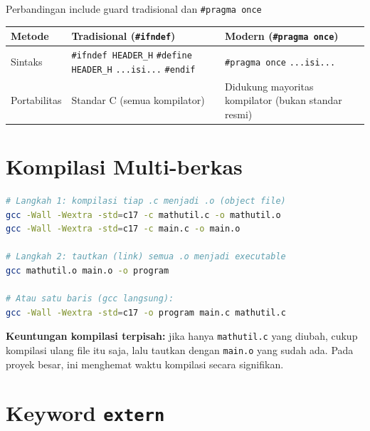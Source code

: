 \documentclass[../main.tex]{subfiles}
\begin{document}
\begin{modultable}[]{Perbandingan include guard tradisional dan \texttt{\#pragma once}}
\begin{tabular}{|l|p{5cm}|p{5cm}|}
\hline
\textbf{Metode} & \textbf{Tradisional (\texttt{\#ifndef})} & \textbf{Modern (\texttt{\#pragma once})} \\
\hline
Sintaks &
\texttt{\#ifndef HEADER\_H} \newline
\texttt{\#define HEADER\_H} \newline
\texttt{...isi...} \newline
\texttt{\#endif} &
\texttt{\#pragma once} \newline
\texttt{...isi...} \\
\hline
Portabilitas & Standar C (semua kompilator) & Didukung mayoritas kompilator (bukan standar resmi) \\
\hline
\end{tabular}
\end{modultable}

\section{Kompilasi Multi-berkas}

\begin{lstlisting}[language=bash,caption=Langkah kompilasi terpisah]
# Langkah 1: kompilasi tiap .c menjadi .o (object file)
gcc -Wall -Wextra -std=c17 -c mathutil.c -o mathutil.o
gcc -Wall -Wextra -std=c17 -c main.c -o main.o

# Langkah 2: tautkan (link) semua .o menjadi executable
gcc mathutil.o main.o -o program

# Atau satu baris (gcc langsung):
gcc -Wall -Wextra -std=c17 -o program main.c mathutil.c
\end{lstlisting}

\begin{konsep}
\textbf{Keuntungan kompilasi terpisah:} jika hanya \texttt{mathutil.c} yang diubah, cukup kompilasi ulang file itu saja, lalu tautkan dengan \texttt{main.o} yang sudah ada. Pada proyek besar, ini menghemat waktu kompilasi secara signifikan.
\end{konsep}

\section{Keyword \texttt{extern}}
\end{document}
